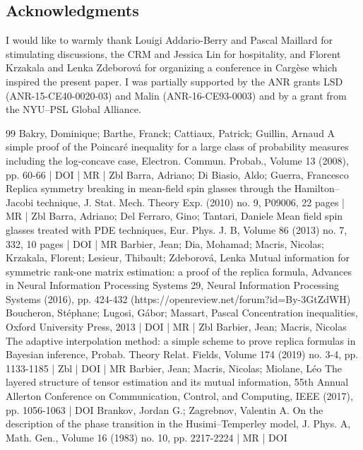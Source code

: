 \documentclass[10pt]{amsart}
\theoremstyle{definition}\newtheorem{defi}[theo]{Definition}\newtheorem{rema}[theo]{Remark}\newtheorem{exam}[theo]{Example}\newtheorem{exem}[theo]{Example}\newtheorem{nota}[theo]{Notation}
\newcommand{\1}{\mathds{1}}
\begin{document}
\subsection*{Acknowledgments}
I would like to warmly thank Louigi Addario-Berry and Pascal Maillard for stimulating discussions, the CRM and Jessica Lin for hospitality, and Florent Krzakala and Lenka Zdeborová for organizing a conference in Cargèse which inspired the present paper. I was partially supported by the ANR grants LSD (ANR-15-CE40-0020-03) and Malin (ANR-16-CE93-0003) and by a grant from the NYU--PSL Global Alliance.




\begin{thebibliography}{99}
Bakry, Dominique; Barthe, Franck; Cattiaux, Patrick; Guillin, Arnaud A simple proof of the Poincaré inequality for a large class of probability measures including the log-concave case, Electron. Commun. Probab., Volume 13 (2008), pp. 60-66 | DOI | MR | Zbl
Barra, Adriano; Di Biasio, Aldo; Guerra, Francesco Replica symmetry breaking in mean-field spin glasses through the Hamilton–Jacobi technique, J. Stat. Mech. Theory Exp. (2010) no. 9, P09006, 22 pages | MR | Zbl
Barra, Adriano; Del Ferraro, Gino; Tantari, Daniele Mean field spin glasses treated with PDE techniques, Eur. Phys. J. B, Volume 86 (2013) no. 7, 332, 10 pages | DOI | MR
Barbier, Jean; Dia, Mohamad; Macris, Nicolas; Krzakala, Florent; Lesieur, Thibault; Zdeborová, Lenka Mutual information for symmetric rank-one matrix estimation: a proof of the replica formula, Advances in Neural Information Processing Systems 29, Neural Information Processing Systems (2016), pp. 424-432 (https://openreview.net/forum?id=By-3GtZdWH)
Boucheron, Stéphane; Lugosi, Gábor; Massart, Pascal Concentration inequalities, Oxford University Press, 2013 | DOI | MR | Zbl
Barbier, Jean; Macris, Nicolas The adaptive interpolation method: a simple scheme to prove replica formulas in Bayesian inference, Probab. Theory Relat. Fields, Volume 174 (2019) no. 3-4, pp. 1133-1185 | Zbl | DOI | MR
Barbier, Jean; Macris, Nicolas; Miolane, Léo The layered structure of tensor estimation and its mutual information, 55th Annual Allerton Conference on Communication, Control, and Computing, IEEE (2017), pp. 1056-1063 | DOI
Brankov, Jordan G.; Zagrebnov, Valentin A. On the description of the phase transition in the Husimi–Temperley model, J. Phys. A, Math. Gen., Volume 16 (1983) no. 10, pp. 2217-2224 | MR | DOI

\end{thebibliography}
\end{document}

